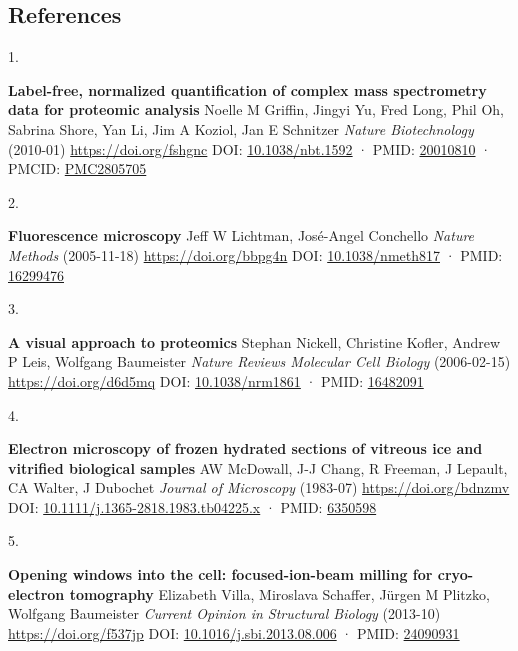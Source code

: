 \documentclass[
]{article}
\newlength{\cslhangindent}
\newlength{\csllabelwidth}
\newlength{\cslentryspacingunit} %
\newenvironment{CSLReferences}[2] %
 {%
  \setlength{\parindent}{0pt}
  \ifodd #1
  \let\oldpar\par
  \def\par{\hangindent=\cslhangindent\oldpar}
  \fi
  \setlength{\parskip}{#2\cslentryspacingunit}
 }%
 {}
\newcommand{\CSLBlock}[1]{#1\hfill\break}
\newcommand{\CSLLeftMargin}[1]{\parbox[t]{\csllabelwidth}{#1}}
\newcommand{\CSLRightInline}[1]{\parbox[t]{\linewidth - \csllabelwidth}{#1}\break}
\begin{document}
\hypertarget{references}{%
\subsection{References}\label{references}}

\hypertarget{refs}{}
\begin{CSLReferences}{0}{0}
\leavevmode{}%
\CSLLeftMargin{1. }%
\CSLRightInline{\textbf{Label-free, normalized quantification of complex mass spectrometry data for proteomic analysis}
\CSLBlock{Noelle M Griffin, Jingyi Yu, Fred Long, Phil Oh, Sabrina Shore, Yan Li, Jim A Koziol, Jan E Schnitzer} \emph{Nature Biotechnology} (2010-01) \url{https://doi.org/fshgnc}
\CSLBlock{DOI: \href{https://doi.org/10.1038/nbt.1592}{10.1038/nbt.1592} · PMID: \href{https://www.ncbi.nlm.nih.gov/pubmed/20010810}{20010810} · PMCID: \href{https://www.ncbi.nlm.nih.gov/pmc/articles/PMC2805705}{PMC2805705}}}

\leavevmode{}%
\CSLLeftMargin{2. }%
\CSLRightInline{\textbf{Fluorescence microscopy}
\CSLBlock{Jeff W Lichtman, José-Angel Conchello} \emph{Nature Methods} (2005-11-18) \url{https://doi.org/bbpg4n}
\CSLBlock{DOI: \href{https://doi.org/10.1038/nmeth817}{10.1038/nmeth817} · PMID: \href{https://www.ncbi.nlm.nih.gov/pubmed/16299476}{16299476}}}

\leavevmode{}%
\CSLLeftMargin{3. }%
\CSLRightInline{\textbf{A visual approach to proteomics}
\CSLBlock{Stephan Nickell, Christine Kofler, Andrew P Leis, Wolfgang Baumeister} \emph{Nature Reviews Molecular Cell Biology} (2006-02-15) \url{https://doi.org/d6d5mq}
\CSLBlock{DOI: \href{https://doi.org/10.1038/nrm1861}{10.1038/nrm1861} · PMID: \href{https://www.ncbi.nlm.nih.gov/pubmed/16482091}{16482091}}}

\leavevmode{}%
\CSLLeftMargin{4. }%
\CSLRightInline{\textbf{Electron microscopy of frozen hydrated sections of vitreous ice and vitrified biological samples}
\CSLBlock{AW McDowall, J-J Chang, R Freeman, J Lepault, CA Walter, J Dubochet} \emph{Journal of Microscopy} (1983-07) \url{https://doi.org/bdnzmv}
\CSLBlock{DOI: \href{https://doi.org/10.1111/j.1365-2818.1983.tb04225.x}{10.1111/j.1365-2818.1983.tb04225.x} · PMID: \href{https://www.ncbi.nlm.nih.gov/pubmed/6350598}{6350598}}}

\leavevmode{}%
\CSLLeftMargin{5. }%
\CSLRightInline{\textbf{Opening windows into the cell: focused-ion-beam milling for cryo-electron tomography}
\CSLBlock{Elizabeth Villa, Miroslava Schaffer, Jürgen M Plitzko, Wolfgang Baumeister} \emph{Current Opinion in Structural Biology} (2013-10) \url{https://doi.org/f537jp}
\CSLBlock{DOI: \href{https://doi.org/10.1016/j.sbi.2013.08.006}{10.1016/j.sbi.2013.08.006} · PMID: \href{https://www.ncbi.nlm.nih.gov/pubmed/24090931}{24090931}}}


\end{CSLReferences}
\end{document}
